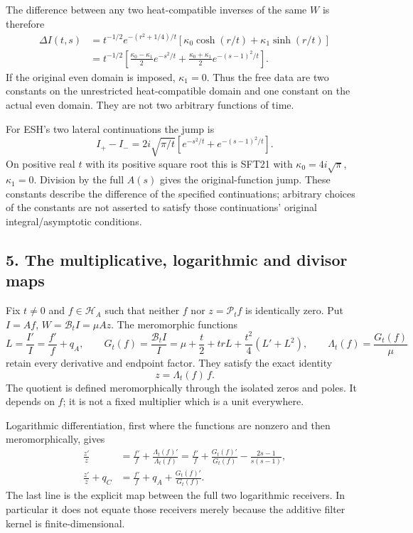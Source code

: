 \documentclass[
  10pt,
  a4paper,
]{article}
\begin{document}
The difference between any two heat-compatible inverses of the same
\(W\) is therefore \[
 \begin{aligned}
 \Delta I(t,s)
 &=t^{-1/2}e^{-(r^2+1/4)/t}
       [\kappa_0\cosh(r/t)+\kappa_1\sinh(r/t)]\\
 &=t^{-1/2}
     \left[\frac{\kappa_0-\kappa_1}{2}e^{-s^2/t}
           +\frac{\kappa_0+\kappa_1}{2}e^{-(s-1)^2/t}\right].
 \end{aligned}
 \tag{SFT21}
\] If the original even domain is imposed, \(\kappa_1=0\). Thus the free
data are two constants on the unrestricted heat-compatible domain and
one constant on the actual even domain. They are not two arbitrary
functions of time.

For ESH's two lateral continuations the jump is \[
 I_+-I_-=2i\sqrt{\pi/t}
              [e^{-s^2/t}+e^{-(s-1)^2/t}].
 \tag{SFT22}
\] On positive real \(t\) with its positive square root this is SFT21
with \(\kappa_0=4i\sqrt\pi\), \(\kappa_1=0\). Division by the full
\(A(s)\) gives the original-function jump. These constants describe the
difference of the specified continuations; arbitrary choices of the
constants are not asserted to satisfy those continuations' original
integral/asymptotic conditions.

\subsection{5. The multiplicative, logarithmic and divisor
maps}\label{the-multiplicative-logarithmic-and-divisor-maps}

Fix \(t\ne0\) and \(f\in\mathcal H_A\) such that neither \(f\) nor
\(z=\mathcal P_tf\) is identically zero. Put \(I=Af\),
\(W=\mathcal B_tI=\mu Az\). The meromorphic functions \[
 L=\frac{I'}I=\frac{f'}f+q_A,\qquad
 G_t(f)=\frac{\mathcal B_tI}{I}
       =\mu+\frac t2+trL+\frac{t^2}4(L'+L^2),
 \qquad
 \Lambda_t(f)=\frac{G_t(f)}{\mu}
 \tag{SFT23}
\] retain every derivative and endpoint factor. They satisfy the exact
identity \[
 \boxed{z=\Lambda_t(f)\,f.}
 \tag{SFT24}
\] The quotient is defined meromorphically through the isolated zeros
and poles. It depends on \(f\); it is not a fixed multiplier which is a
unit everywhere.

Logarithmic differentiation, first where the functions are nonzero and
then meromorphically, gives \[
 \boxed{\begin{aligned}
 \frac{z'}z
   &=\frac{f'}f+\frac{\Lambda_t(f)'}{\Lambda_t(f)}
     =\frac{f'}f+\frac{G_t(f)'}{G_t(f)}-\frac{2s-1}{s(s-1)},\\
 \frac{z'}z+q_C
   &=\frac{f'}f+q_A+\frac{G_t(f)'}{G_t(f)}.
 \end{aligned}}
 \tag{SFT25}
\] The last line is the explicit map between the full two logarithmic
receivers. In particular it does not equate those receivers merely
because the additive filter kernel is finite-dimensional.
\end{document}
